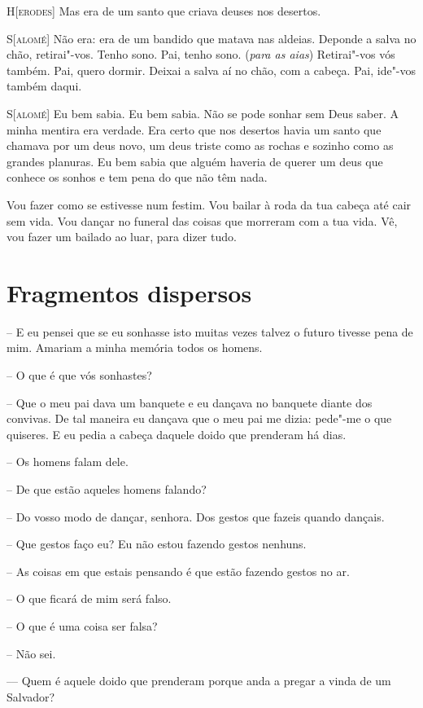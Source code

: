 \textsc{H[erodes]} Mas era de um santo que criava deuses nos desertos.

\textsc{S[alomé]} Não era: era de um bandido que matava nas aldeias. Deponde
a salva no chão, retirai"-vos. Tenho sono. Pai, tenho sono.
(\textit{para as aias}) Retirai"-vos vós também. Pai, quero dormir.
Deixai a salva aí no chão, com a cabeça. Pai, ide"-vos também daqui. 

\textsc{S[alomé]} Eu bem sabia. Eu bem sabia. Não se pode sonhar sem Deus
saber. A minha mentira era verdade. Era certo que nos desertos havia
um santo que chamava por um deus novo, um deus triste como as rochas
e sozinho como as grandes planuras. Eu bem sabia que alguém haveria
de querer um deus que conhece os sonhos e tem pena do que não têm
nada.

Vou fazer como se estivesse num festim. Vou bailar à roda da tua
cabeça até cair sem vida. Vou dançar no funeral das coisas que
morreram com a tua vida. Vê, vou fazer um bailado ao luar, para dizer
tudo.

\section{Fragmentos dispersos}

-- E eu pensei que se eu sonhasse isto muitas vezes talvez o futuro
tivesse pena de mim. Amariam a minha memória todos os homens.

-- O que é que vós sonhastes?

-- Que o meu pai dava um banquete e eu dançava no banquete diante dos
convivas. De tal maneira eu dançava que o meu pai me dizia: pede"-me o
que quiseres. E eu pedia a cabeça daquele doido que prenderam há
dias.

-- Os homens falam dele.

-- De que estão aqueles homens falando?

-- Do vosso modo de dançar, senhora. Dos gestos que fazeis quando
dançais.

-- Que gestos faço eu? Eu não estou fazendo gestos nenhuns.

-- As coisas em que estais pensando é que estão fazendo gestos no ar.

\asterisc 

-- O que ficará de mim será falso. 

-- O que é uma coisa ser falsa? 

-- Não sei.

\asterisc 

–– Quem é aquele doido que prenderam porque anda a pregar a vinda de
um Salvador?

